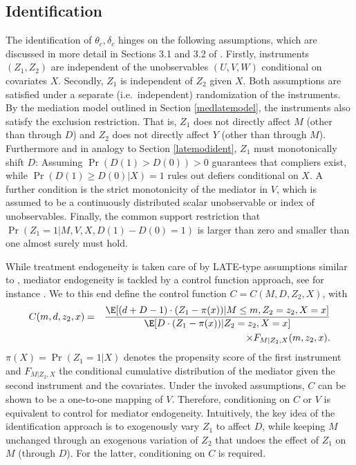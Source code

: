 \documentclass[nojss]{jss}
\begin{document}
\subsection{Identification}\label{idmedlate}

The identification of $\theta_c, \delta_c$ hinges on the following assumptions, which are discussed in more detail in Sections 3.1 and 3.2 of \citet{FrHu17}. Firstly, instruments $(Z_{1},Z_{2})$ are independent of the unobservables $(U,V,W)$ conditional on covariates $X$. Secondly, $Z_{1}$ is independent of $Z_{2}$ given $X$. Both assumptions are satisfied under a separate (i.e.\ independent) randomization of the instruments. By the mediation model outlined in Section \ref{medlatemodel}, the instruments also satisfy the exclusion restriction. That is, $Z_1$ does not directly affect $M$ (other than through $D$) and $Z_2$ does not directly affect $Y$ (other than through $M$). Furthermore and in analogy to Section \ref{latemodident}, $Z_1$ must monotonically shift $D$: Assuming $\Pr(D(1)> D(0))>0$ guarantees that compliers exist, while $\Pr(D(1)\geq D(0)|X)=1$ rules out defiers conditional on $X$. A further condition is the strict monotonicity of the mediator in $V$, which is assumed to be a continuously distributed scalar unobservable or index of unobservables. Finally, the common support restriction that $\Pr(Z_1 = 1 | M, V, X, D(1)-D(0)=1)$ is larger than zero and smaller than one almost surely must hold.

While treatment endogeneity is taken care of by LATE-type assumptions similar to \citet{Abadie00}, mediator endogeneity is tackled by a control function approach, see for instance \citet{ImNe09}. We to this end define the control function $C=C(M,D,Z_{2},X)$, with
\begin{eqnarray}\label{control}
C( m,d,z_{2},x) &=& \frac{\E[( d+D-1) \cdot (Z_{1}-\pi(x) ) | M \leq m,Z_{2}=z_{2},X=x] }{\E[ D\cdot ( Z_{1}-\pi(x) )|Z_{2}=z_{2},X=x] } \nonumber \\
&&\times F_{M|Z_{2},X}( m,z_{2},x) \text{.}
\end{eqnarray}
$\pi(X)=\Pr (Z_{1}=1|X)$ denotes the propensity score of the first instrument and  $F_{M|Z_{2},X}$ the conditional cumulative distribution of the mediator given the second instrument and the covariates. Under the invoked assumptions, $C$ can be shown to be a one-to-one mapping of $V$. Therefore, conditioning on $C$ or $V$ is equivalent to control for mediator endogeneity. Intuitively, the key idea of the identification approach is to exogenously vary $Z_1$ to affect $D$, while keeping $M$ unchanged through an exogenous variation of $Z_2$ that undoes the effect of $Z_1$ on $M$ (through $D$). For the latter, conditioning on $C$ is required.
\end{document}
